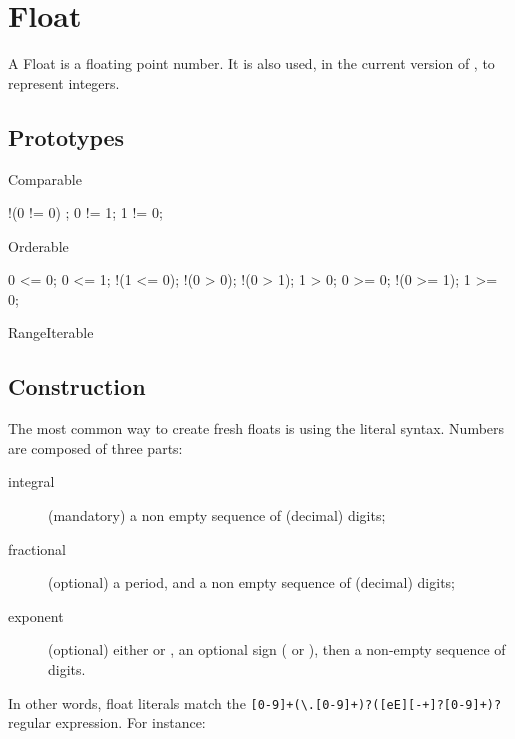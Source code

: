 
\section{Float}

A Float is a floating point number.  It is also used, in the current
version of \us, to represent integers.

\subsection{Prototypes}

\begin{refObjects}
\item[Comparable]
\begin{urbiassert}
!(0 != 0) ; 0 != 1; 1 != 0;
\end{urbiassert}
\item[Orderable]
\begin{urbiassert}
  0 <= 0;    0 <= 1;  !(1 <= 0);
!(0 >  0); !(0 >  1);   1 >  0;
  0 >= 0;  !(0 >= 1);   1 >= 0;
\end{urbiassert}
\item[RangeIterable]
\end{refObjects}

\subsection{Construction}
\label{sec:float:ctor}

The most common way to create fresh floats is using the literal
syntax.  Numbers are composed of three parts:
\begin{description}
\item[integral] (mandatory) a non empty sequence of (decimal) digits;
\item[fractional] (optional) a period, and a non empty sequence of
  (decimal) digits;
\item[exponent] (optional) either  or , an optional
  sign (\samp{+} or \samp{-}), then a non-empty sequence of digits.
\end{description}

In other words, float literals match the
\lstinline|[0-9]+(\.[0-9]+)?([eE][-+]?[0-9]+)?| regular expression.  For
instance:

